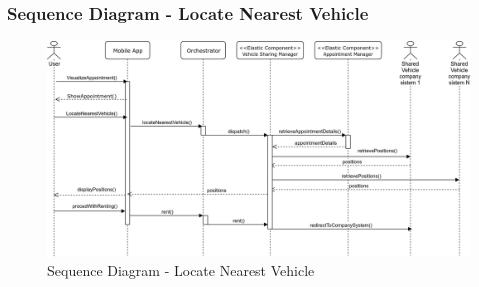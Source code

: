 	\subsubsection{Sequence Diagram - Locate Nearest Vehicle}
		\begin{figure}[H]
			\centerline{\includegraphics[width=0.9\paperwidth]{Images/LocateNearest}}
			\caption{Sequence Diagram - Locate Nearest Vehicle}
		\end{figure}
		

